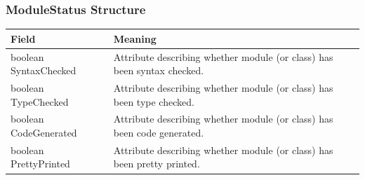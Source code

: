 \documentclass[\pformat,12pt]{article}
\newcommand{\pbs}[1]{\let\temp=\\#1\let\\=\temp}
\begin{document}
\subsubsection{ModuleStatus Structure}\label{api:ModuleStatusStructure}
\mbox{}
\begin{longtable}{|>{\pbs\raggedright\ttfamily}p{6.6cm}%
                  |>{\pbs\raggedright}p{6.6cm}|} \hline
  \textrm{\bfseries Field} &  \textrm{\bfseries Meaning} \\ \hline
boolean SyntaxChecked
  & Attribute describing whether module (or class) has been syntax checked.
\\ \hline
boolean TypeChecked
  & Attribute describing whether module (or class) has been type checked.
\\ \hline
boolean CodeGenerated
  & Attribute describing whether module (or class) has been code generated.
\\ \hline
boolean PrettyPrinted
  & Attribute describing whether module (or class) has been pretty printed.
\\ \hline
\end{longtable}
\end{document}
